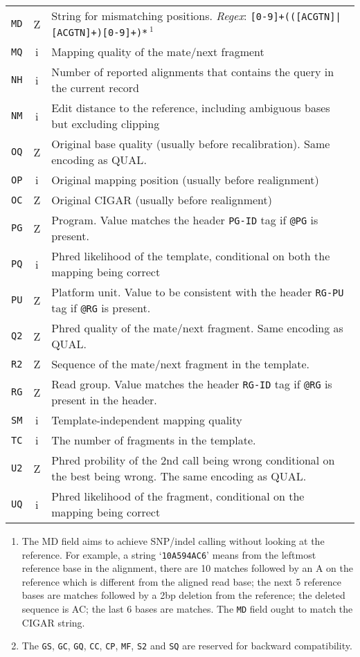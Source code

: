\documentclass[10pt]{article}
\begin{document}
\begin{center}
\begin{tabular}{ccp{12.5cm}}
  {\tt MD} & Z & String for mismatching positions. \emph{Regex}: {\tt [0-9]+(([ACGTN]|\char92\char94[ACGTN]+)[0-9]+)*}\,$^1$\\
  {\tt MQ} & i & Mapping quality of the mate/next fragment \\
  {\tt NH} & i & Number of reported alignments that contains the query in the current record\\
  {\tt NM} & i & Edit distance to the reference, including ambiguous bases but excluding clipping\\
  {\tt OQ} & Z & Original base quality (usually before recalibration). Same encoding as {\sf QUAL}.\\
  {\tt OP} & i & Original mapping position (usually before realignment) \\
  {\tt OC} & Z & Original CIGAR (usually before realignment) \\
  {\tt PG} & Z & Program. Value matches the header {\tt PG-ID} tag if {\tt @PG} is present. \\
  {\tt PQ} & i & Phred likelihood of the template, conditional on both the mapping being correct \\
  {\tt PU} & Z & Platform unit. Value to be consistent with the header {\tt RG-PU} tag if {\tt @RG} is present.\\
  {\tt Q2} & Z & Phred quality of the mate/next fragment. Same encoding as {\sf QUAL}.\\
  {\tt R2} & Z & Sequence of the mate/next fragment in the template. \\
  {\tt RG} & Z & Read group. Value matches the header {\tt RG-ID} tag if {\tt @RG} is present in the header. \\
  {\tt SM} & i & Template-independent mapping quality \\
  {\tt TC} & i & The number of fragments in the template.\\
  {\tt U2} & Z & Phred probility of the 2nd call being wrong conditional on the best being wrong. The same encoding as {\sf QUAL}. \\
  {\tt UQ} & i & Phred likelihood of the fragment, conditional on the mapping being correct \\
  \hline
\end{tabular}
\end{center}
\begin{enumerate}
\item The MD field aims to achieve SNP/indel calling without looking at
  the reference. For example, a string `{\tt 10A5\char94AC6}' means from
  the leftmost reference base in the alignment, there are 10 matches
  followed by an A on the reference which is different from the aligned
  read base; the next 5 reference bases are matches followed by a 2bp
  deletion from the reference; the deleted sequence is AC; the last 6
  bases are matches. The {\tt MD} field ought to match the {\sf CIGAR}
  string.
\item The {\tt GS}, {\tt GC}, {\tt GQ}, {\tt CC}, {\tt CP}, {\tt MF}, {\tt S2}
  and {\tt SQ} are reserved for backward compatibility.
\end{enumerate}
\end{document}
